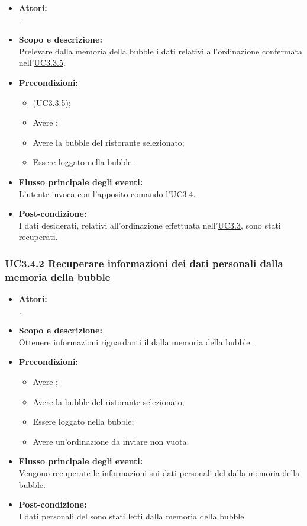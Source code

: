 \begin{itemize}
	\item \textbf{Attori:}
	\\.
	\item \textbf{Scopo e descrizione:} 
	\\Prelevare dalla memoria della bubble i dati relativi all'ordinazione confermata nell’\hyperref[UC3.3.5]{UC3.3.5}.
	\item \textbf{Precondizioni:}
	\begin{itemize}
		\item \hyperref[UC3.3.5]{(UC3.3.5)};
		\item Avere ;
		\item Avere la bubble del ristorante selezionato;
		\item Essere loggato nella bubble.
	\end{itemize}
	\item \textbf{Flusso principale degli eventi:}
	\\L'utente invoca con l'apposito comando l’\hyperref[UC3.4]{UC3.4}.
	\item \textbf{Post-condizione:}
	\\I dati desiderati, relativi all'ordinazione effettuata nell’\hyperref[UC3.3]{UC3.3}, sono stati recuperati. 
\end{itemize}

\subsubsection{UC3.4.2 Recuperare informazioni dei dati personali dalla memoria della bubble} \label{UC3.4.2}

\begin{itemize}
	\item \textbf{Attori:}
	\\.
	\item \textbf{Scopo e descrizione:} 
	\\Ottenere informazioni riguardanti il  dalla memoria della bubble.
	\item \textbf{Precondizioni:}
	\begin{itemize}
		\item Avere ;
		\item Avere la bubble del ristorante selezionato;
		\item Essere loggato nella bubble;
		\item Avere un'ordinazione da inviare non vuota.
	\end{itemize}
	\item \textbf{Flusso principale degli eventi:}
	\\Vengono recuperate le informazioni sui dati personali del  dalla memoria della bubble.
	\item \textbf{Post-condizione:}
	\\I dati personali del  sono stati letti dalla memoria della bubble.
\end{itemize}


